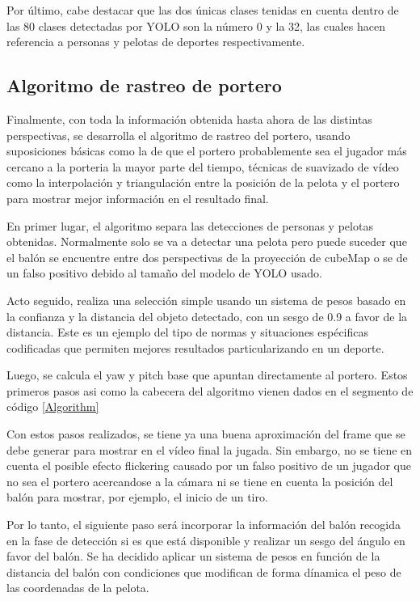 Por último, cabe destacar que las dos únicas clases tenidas en cuenta dentro de las 80 clases detectadas por YOLO son la número 0 y la 32, las cuales hacen referencia a personas y pelotas de deportes respectivamente.

\subsection{Algoritmo de rastreo de portero}
Finalmente, con toda la información obtenida hasta ahora de las distintas perspectivas, se desarrolla el algoritmo de rastreo del portero, usando suposiciones básicas como la de que el portero probablemente sea el jugador más cercano a la porteria la mayor parte del tiempo, técnicas de suavizado de vídeo como la interpolación y triangulación entre la posición de la pelota y el portero para mostrar mejor información en el resultado final.

En primer lugar, el algoritmo separa las detecciones de personas y pelotas obtenidas. Normalmente solo se va a detectar una pelota pero puede suceder que el balón se encuentre entre dos perspectivas de la proyección de cubeMap o se de un falso positivo debido al tamaño del modelo de YOLO usado. 

Acto seguido, realiza una selección simple usando un sistema de pesos basado en la confianza y la distancia del objeto detectado, con un sesgo de 0.9 a favor de la distancia. Este es un ejemplo del tipo de normas y situaciones espécificas codificadas que permiten mejores resultados particularizando en un deporte.

Luego, se calcula el yaw y pitch base que apuntan directamente al portero. Estos primeros pasos asi como la cabecera del algoritmo vienen dados en el segmento de código \ref{Algorithm}


Con estos pasos realizados, se tiene ya una buena aproximación del frame que se debe generar para mostrar en el vídeo final la jugada. Sin embargo, no se tiene en cuenta el posible efecto flickering causado por un falso positivo de un jugador que no sea el portero acercandose a la cámara ni se tiene en cuenta la posición del balón para mostrar, por ejemplo, el inicio de un tiro.

Por lo tanto, el siguiente paso será incorporar la información del balón recogida en la fase de detección si es que está disponible y realizar un sesgo del ángulo en favor del balón. Se ha decidido aplicar un sistema de pesos en función de la distancia del balón con condiciones que modifican de forma dínamica el peso de las coordenadas de la pelota.


